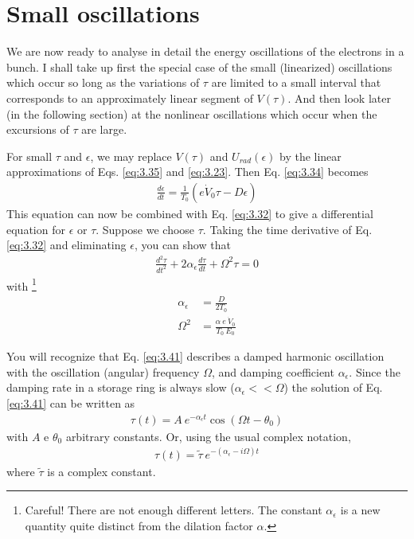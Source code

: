 \documentclass[../sands-adaptation.tex]{subfiles}
\begin{document}
\section{Small oscillations}\label{sec:3.5}
We are now ready to analyse in detail the energy oscillations of the electrons in a bunch. I shall take up first the special case of the small (linearized) oscillations which occur so long as the variations of $\tau$ are limited to a small interval that corresponds to an approximately linear segment of $V(\tau)$. And then look later (in the following section) at the nonlinear oscillations which occur when the excursions of $\tau$ are large.

For small $\tau$ and $\epsilon$, we may replace $V(\tau)$ and $U_{rad}(\epsilon)$ by the linear approximations of Eqs. \eqref{eq:3.35} and \eqref{eq:3.23}. Then Eq. \eqref{eq:3.34} becomes
\begin{align}
	\frac{d\epsilon}{dt} = \frac{1}{T_0}(e\dot{V}_0 \tau - D\epsilon)\label{eq:3.40}
\end{align}
This equation can now be combined with Eq. \eqref{eq:3.32} to give a differential equation for $\epsilon$ or $\tau$. Suppose we choose $\tau$. Taking the time derivative of Eq. \eqref{eq:3.32} and eliminating $\epsilon$, you can show that
\begin{align}
	\frac{d^2 \tau}{dt^2} + 2\alpha_\epsilon \frac{d\tau}{dt} + \Omega^2 \tau = 0\label{eq:3.41}
\end{align}
with \footnote{Careful! There are not enough different letters. The constant $\alpha_\epsilon$ is a new quantity quite distinct from the dilation factor $\alpha$.}
\begin{align}
	\alpha_\epsilon &= \frac{D}{2 T_0} \label{eq:3.42}\\
	\Omega^2 &= \frac{\alpha\ e\ \dot{V}_0}{T_0\ E_0} \label{eq:3.43}
\end{align}

You will recognize that Eq. \eqref{eq:3.41} describes a damped harmonic oscillation with the oscillation (angular) frequency $\Omega$, and damping coefficient $\alpha_\epsilon$. Since the damping rate in a storage ring is always slow ($\alpha_\epsilon << \Omega$) the solution of Eq. \eqref{eq:3.41} can be written as
\begin{align} \label{eq:3.44}
	\tau(t) = A\ e^{-\alpha_\epsilon t} \cos(\Omega t - \theta_0)
\end{align}
with $A$ e $\theta_0$ arbitrary constants. Or, using the usual complex notation,
\begin{align}
	\tau(t) = \tilde{\tau}\ e^{-(\alpha_\epsilon - i\Omega)t}
\end{align}
where $\tilde{\tau}$ is a complex constant.
\end{document}
